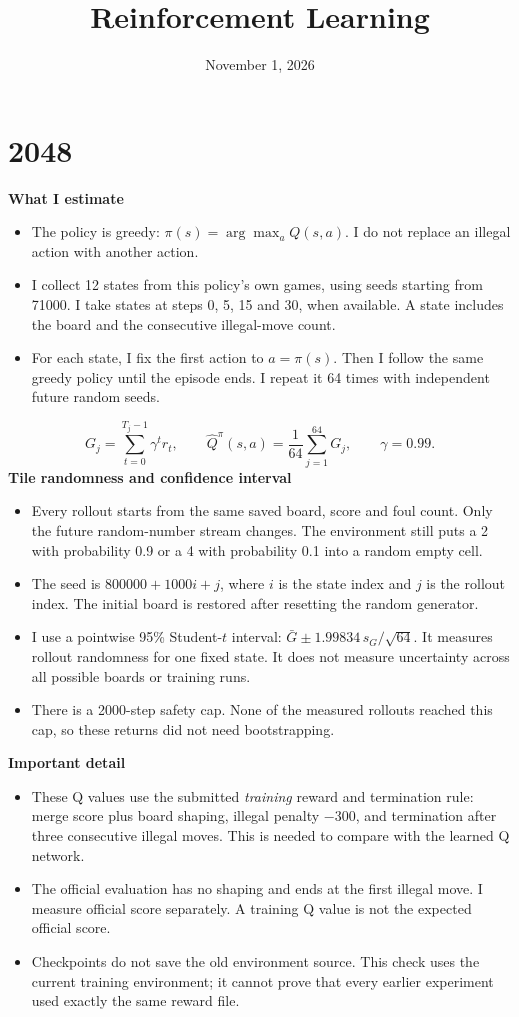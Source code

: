 \documentclass[a4paper]{article}
\date{November 1, 2026}
\title{Reinforcement Learning}
\begin{document}
\header{}
\section{2048}
\begin{answer}
\textbf{What I estimate}
\begin{itemize}
\item The policy is greedy: $\pi(s)=\arg\max_a Q(s,a)$. I do not replace an illegal action with another action.
\item I collect 12 states from this policy's own games, using seeds starting from 71000. I take states at steps 0, 5, 15 and 30, when available. A state includes the board and the consecutive illegal-move count.
\item For each state, I fix the first action to $a=\pi(s)$. Then I follow the same greedy policy until the episode ends. I repeat it 64 times with independent future random seeds.
\end{itemize}
\[
 G_j=\sum_{t=0}^{T_j-1}\gamma^t r_t,\qquad
 \widehat Q^\pi(s,a)=\frac{1}{64}\sum_{j=1}^{64}G_j,\qquad \gamma=0.99.
\]
\textbf{Tile randomness and confidence interval}
\begin{itemize}
\item Every rollout starts from the same saved board, score and foul count. Only the future random-number stream changes. The environment still puts a 2 with probability 0.9 or a 4 with probability 0.1 into a random empty cell.
\item The seed is $800000+1000i+j$, where $i$ is the state index and $j$ is the rollout index. The initial board is restored after resetting the random generator.
\item I use a pointwise 95\% Student-$t$ interval: $\bar G\pm 1.99834\,s_G/\sqrt{64}$. It measures rollout randomness for one fixed state. It does not measure uncertainty across all possible boards or training runs.
\item There is a 2000-step safety cap. None of the measured rollouts reached this cap, so these returns did not need bootstrapping.
\end{itemize}
\textbf{Important detail}
\begin{itemize}
\item These Q values use the submitted \emph{training} reward and termination rule: merge score plus board shaping, illegal penalty $-300$, and termination after three consecutive illegal moves. This is needed to compare with the learned Q network.
\item The official evaluation has no shaping and ends at the first illegal move. I measure official score separately. A training Q value is not the expected official score.
\item Checkpoints do not save the old environment source. This check uses the current training environment; it cannot prove that every earlier experiment used exactly the same reward file.
\end{itemize}
\end{answer}
\end{document}
